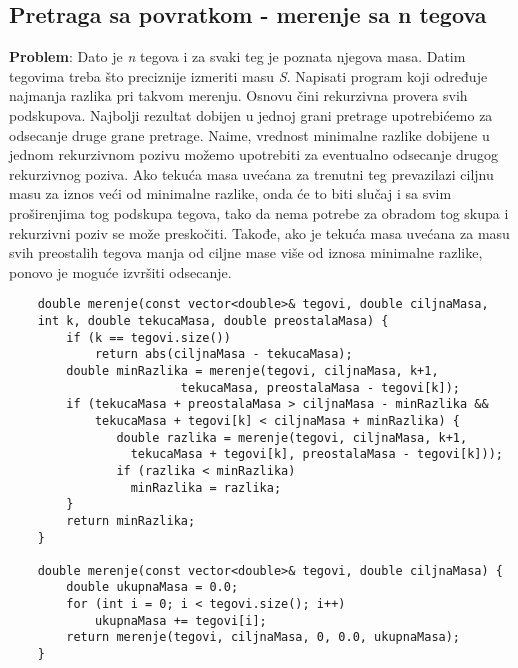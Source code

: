 \documentclass{article}
\begin{document}
\subsection{Pretraga sa povratkom - merenje sa n tegova}
\textbf{Problem}: Dato je \textit{n} tegova i za svaki teg je poznata njegova masa. Datim
tegovima treba što preciznije izmeriti masu \textit{S}. Napisati program koji određuje najmanja razlika pri takvom merenju.
\newline
Osnovu čini rekurzivna provera
svih podskupova. Najbolji rezultat dobijen u jednoj grani pretrage upotrebićemo za
odsecanje druge grane pretrage. Naime, vrednost minimalne razlike dobijene u
jednom rekurzivnom pozivu možemo upotrebiti za eventualno odsecanje drugog
rekurzivnog poziva. Ako tekuća masa uvećana za trenutni teg prevazilazi ciljnu
masu za iznos veći od minimalne razlike, onda će to biti slučaj i sa svim
proširenjima tog podskupa tegova, tako da nema potrebe za obradom tog skupa
i rekurzivni poziv se može preskočiti. Takođe, ako je tekuća masa uvećana za
masu svih preostalih tegova manja od ciljne mase više od iznosa minimalne
razlike, ponovo je moguće izvršiti odsecanje.
\begin{lstlisting}
    double merenje(const vector<double>& tegovi, double ciljnaMasa,
    int k, double tekucaMasa, double preostalaMasa) {
        if (k == tegovi.size())
            return abs(ciljnaMasa - tekucaMasa);
        double minRazlika = merenje(tegovi, ciljnaMasa, k+1,
                        tekucaMasa, preostalaMasa - tegovi[k]);
        if (tekucaMasa + preostalaMasa > ciljnaMasa - minRazlika &&
            tekucaMasa + tegovi[k] < ciljnaMasa + minRazlika) {
               double razlika = merenje(tegovi, ciljnaMasa, k+1,
                 tekucaMasa + tegovi[k], preostalaMasa - tegovi[k]));
               if (razlika < minRazlika)
                 minRazlika = razlika;
        }
        return minRazlika;
    }
    
    double merenje(const vector<double>& tegovi, double ciljnaMasa) {
        double ukupnaMasa = 0.0;
        for (int i = 0; i < tegovi.size(); i++)
            ukupnaMasa += tegovi[i];
        return merenje(tegovi, ciljnaMasa, 0, 0.0, ukupnaMasa);
    }
\end{lstlisting}
\end{document}
